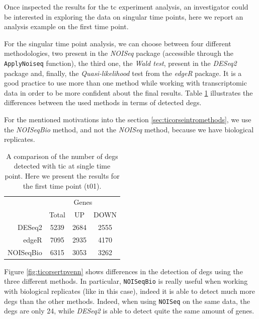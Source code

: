 Once inspected the results for the \gls{tc} experiment analysis, an investigator could be interested in exploring the data on singular time points, here we report an analysis example on the first time point.

For the singular time point analysis, we can choose between four different methodologies, two present in the \textit{NOISeq} package (accessible through the \lstinline!ApplyNoiseq! function), the third one, the \textit{Wald test}, present in the \textit{DESeq2} package and, finally, the \textit{Quasi-likelihood} test from the \textit{edgeR} package.
It is a good practice to use more than one method while working with transcriptomic data in order to be more confident about the final results.
Table \ref{tab:ticorserderesultstp} illustrates the differences between the used methods in terms of detected \glspl{deg}.

For the mentioned motivations into the section \ref{sec:ticorseintromethods}, we use the \textit{NOISeqBio} method, and not the \textit{NOISeq} method, because we have biological replicates.


\begin{table}[H]
\centering
\begin{tabular}{r c c c}
\multicolumn{1}{r}{} & \multicolumn{3}{c}{Genes} \\
\cline{2-4}
\multicolumn{1}{r}{} & Total & UP & DOWN \\
\cline{2-4}
DESeq2 & 5239 & 2684 & 2555 \\
edgeR & 7095 & 2935 & 4170 \\
NOISeqBio & 6315 & 3053 & 3262 \\
\end{tabular}
\caption[\gls{tic} Single Time Points DE methods results]{A comparison of the number of \glspl{deg} detected with \gls{tic} at single time point. Here we present the results for the first time point (t01).}
\label{tab:ticorserderesultstp}
\end{table}

Figure \ref{fig:ticorsertpvenn} shows differences in the detection of \glspl{deg} using the three different methods.
In particular, \lstinline!NOISeqBio! is really useful when working with biological replicates (like in this case), indeed it is able to detect much more \glspl{deg} than the other methods. 
Indeed, when using \lstinline!NOISeq! on the same data, the \glspl{deg} are only 24, while \textit{DESeq2} is able to detect quite the same amount of genes.


